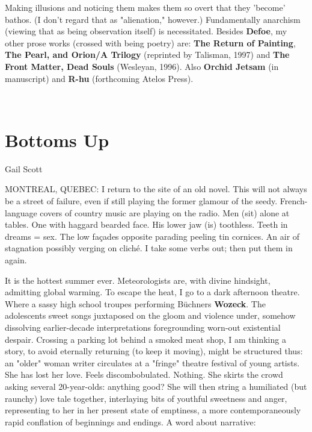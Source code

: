Making illusions and noticing them makes them so overt that they
'become' bathos. (I don't regard that as "alienation," however.)
Fundamentally anarchism (viewing that as being observation itself) is
necessitated. Besides \textbf{Defoe}, my other prose works (crossed with
being poetry) are: \textbf{The Return of Painting}, \textbf{The Pearl,
and Orion/A Trilogy} (reprinted by Talisman, 1997) and \textbf{The Front
Matter, Dead Souls} (Wesleyan, 1996). Also \textbf{Orchid Jetsam} (in
manuscript) and \textbf{R-hu} (forthcoming Atelos Press).

~

\hypertarget{bottoms-up}{%
\section{Bottoms Up}\label{bottoms-up}}

Gail Scott

MONTREAL, QUEBEC: I return to the site of an old novel. This will not
always be a street of failure, even if still playing the former glamour
of the seedy. French-language covers of country music are playing on the
radio. Men (sit) alone at tables. One with haggard bearded face. His
lower jaw (is) toothless. Teeth in dreams = sex. The low façades
opposite parading peeling tin cornices. An air of stagnation possibly
verging on cliché. I take some verbs out; then put them in again.

It is the hottest summer ever. Meteorologists are, with divine
hindsight, admitting global warming. To escape the heat, I go to a dark
afternoon theatre. Where a sassy high school troupes performing Büchners
\textbf{Wozeck}. The adolescents sweet songs juxtaposed on the gloom and
violence under, somehow dissolving earlier-decade interpretations
foregrounding worn-out existential despair. Crossing a parking lot
behind a smoked meat shop, I am thinking a story, to avoid eternally
returning (to keep it moving), might be structured thus: an "older"
woman writer circulates at a "fringe" theatre festival of young artists.
She has lost her love. Feels discombobulated. Nothing. She skirts the
crowd asking several 20-year-olds: anything good? She will then string a
humiliated (but raunchy) love tale together, interlaying bits of
youthful sweetness and anger, representing to her in her present state
of emptiness, a more contemporaneously rapid conflation of beginnings
and endings. A word about narrative:

